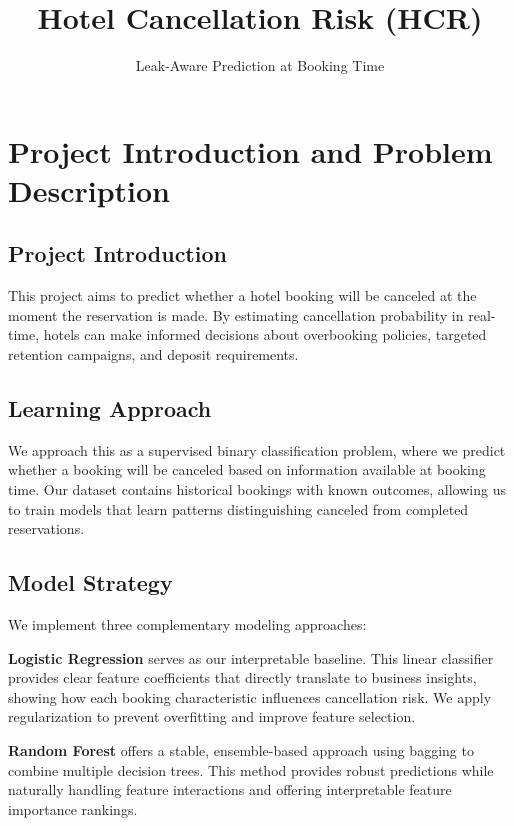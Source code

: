 \documentclass[
  letterpaper,
  DIV=11,
  numbers=noendperiod]{scrartcl}
\title{Hotel Cancellation Risk (HCR)}
\subtitle{Leak-Aware Prediction at Booking Time}
\author{}
\date{}
\renewcommand*\contentsname{Table of contents}
\newcommand\contentsname{Table of contents}
\begin{document}
\maketitle

\renewcommand*\contentsname{Table of contents}
{
\hypersetup{linkcolor=}
\setcounter{tocdepth}{3}
\tableofcontents
}

\section{Project Introduction and Problem
Description}\label{project-introduction-and-problem-description}

\subsection{Project Introduction}\label{project-introduction}

This project aims to predict whether a hotel booking will be canceled at
the moment the reservation is made. By estimating cancellation
probability in real-time, hotels can make informed decisions about
overbooking policies, targeted retention campaigns, and deposit
requirements.

\subsection{Learning Approach}\label{learning-approach}

We approach this as a supervised binary classification problem, where we
predict whether a booking will be canceled based on information
available at booking time. Our dataset contains historical bookings with
known outcomes, allowing us to train models that learn patterns
distinguishing canceled from completed reservations.

\subsection{Model Strategy}\label{model-strategy}

We implement three complementary modeling approaches:

\textbf{Logistic Regression} serves as our interpretable baseline. This
linear classifier provides clear feature coefficients that directly
translate to business insights, showing how each booking characteristic
influences cancellation risk. We apply regularization to prevent
overfitting and improve feature selection.

\textbf{Random Forest} offers a stable, ensemble-based approach using
bagging to combine multiple decision trees. This method provides robust
predictions while naturally handling feature interactions and offering
interpretable feature importance rankings.
\end{document}
